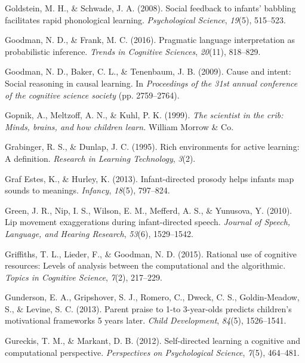 \documentclass[oneside]{report}
\begin{document}
\hypertarget{ref-goldstein2008social}{}
Goldstein, M. H., \& Schwade, J. A. (2008). Social feedback to infants'
babbling facilitates rapid phonological learning. \emph{Psychological
Science}, \emph{19}(5), 515--523.

\hypertarget{ref-goodman2016pragmatic}{}
Goodman, N. D., \& Frank, M. C. (2016). Pragmatic language
interpretation as probabilistic inference. \emph{Trends in Cognitive
Sciences}, \emph{20}(11), 818--829.

\hypertarget{ref-goodman2009cause}{}
Goodman, N. D., Baker, C. L., \& Tenenbaum, J. B. (2009). Cause and
intent: Social reasoning in causal learning. In \emph{Proceedings of the
31st annual conference of the cognitive science society} (pp.
2759--2764).

\hypertarget{ref-gopnik1999scientist}{}
Gopnik, A., Meltzoff, A. N., \& Kuhl, P. K. (1999). \emph{The scientist
in the crib: Minds, brains, and how children learn.} William Morrow \&
Co.

\hypertarget{ref-grabinger1995rich}{}
Grabinger, R. S., \& Dunlap, J. C. (1995). Rich environments for active
learning: A definition. \emph{Research in Learning Technology},
\emph{3}(2).

\hypertarget{ref-graf2013infant}{}
Graf Estes, K., \& Hurley, K. (2013). Infant-directed prosody helps
infants map sounds to meanings. \emph{Infancy}, \emph{18}(5), 797--824.

\hypertarget{ref-green2010lip}{}
Green, J. R., Nip, I. S., Wilson, E. M., Mefferd, A. S., \& Yunusova, Y.
(2010). Lip movement exaggerations during infant-directed speech.
\emph{Journal of Speech, Language, and Hearing Research}, \emph{53}(6),
1529--1542.

\hypertarget{ref-griffiths2015rational}{}
Griffiths, T. L., Lieder, F., \& Goodman, N. D. (2015). Rational use of
cognitive resources: Levels of analysis between the computational and
the algorithmic. \emph{Topics in Cognitive Science}, \emph{7}(2),
217--229.

\hypertarget{ref-gunderson2013parent}{}
Gunderson, E. A., Gripshover, S. J., Romero, C., Dweck, C. S.,
Goldin-Meadow, S., \& Levine, S. C. (2013). Parent praise to 1-to
3-year-olds predicts children's motivational frameworks 5 years later.
\emph{Child Development}, \emph{84}(5), 1526--1541.

\hypertarget{ref-gureckis2012self}{}
Gureckis, T. M., \& Markant, D. B. (2012). Self-directed learning a
cognitive and computational perspective. \emph{Perspectives on
Psychological Science}, \emph{7}(5), 464--481.
\end{document}
